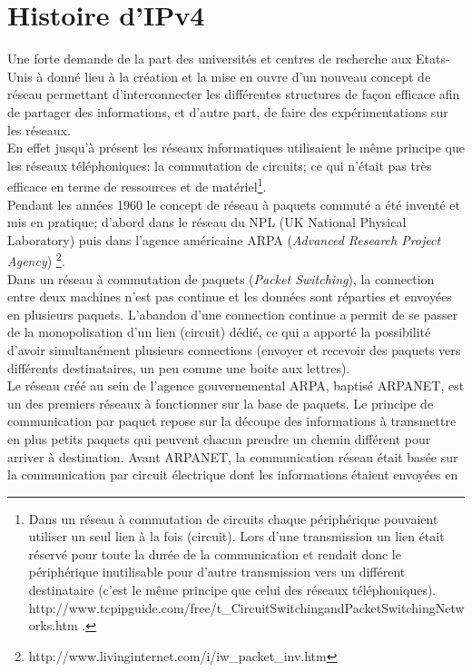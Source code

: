 \section{Histoire d'IPv4}
\label{sec:hist}

Une forte demande de la part des universités et centres de recherche aux
Etats-Unis à donné lieu à la création et la mise en ouvre d'un nouveau concept
de réseau permettant d'interconnecter les différentes structures de façon
efficace afin de partager des informations, et d'autre part, de faire des
expérimentations sur les réseaux.
\\
En effet jusqu'à présent les réseaux informatiques utilisaient le même principe que les
réseaux téléphoniques: la commutation de circuits; ce qui n'était pas très 
efficace en terme de ressources et de matériel\footnote {
Dans un réseau à commutation de circuits chaque périphérique pouvaient utiliser
un seul lien à la fois (circuit). Lors d'une transmission un lien était réservé
pour toute la durée de la communication et rendait donc le périphérique
inutilisable pour d'autre transmission vers un différent destinataire (c'est le même
principe que celui des réseaux téléphoniques).
http://www.tcpipguide.com/free/t\_CircuitSwitchingandPacketSwitchingNetworks.htm .}.
\\
Pendant les années 1960 le concept de réseau à paquets commuté a été inventé et mis en 
pratique; d'abord dans le réseau du NPL (UK National Physical Laboratory)
puis dans l'agence américaine ARPA ({\it Advanced Research Project Agency})
\footnote {http://www.livinginternet.com/i/iw\_packet\_inv.htm}.
\\
Dans un réseau à commutation de paquets ({\it Packet Switching}), la connection
entre deux machines n'est pas continue et les données sont réparties et
envoyées en plusieurs paquets.  L'abandon d'une connection continue a permit de
se passer de la monopolisation d'un lien (circuit) dédié, ce qui a apporté la
possibilité d'avoir simultanément plusieurs connections (envoyer et recevoir
des paquets vers différents destinataires, un peu comme une boite aux lettres). 
\\
Le réseau créé au sein de l'agence gouvernemental ARPA, baptisé ARPANET, est un
des premiers réseaux à fonctionner sur la base de paquets. Le principe de
communication par paquet repose sur la découpe des informations à transmettre en plus
petits paquets qui peuvent chacun prendre un chemin différent pour arriver à
destination.  Avant ARPANET, la communication réseau était basée sur la
communication par circuit électrique dont les informations étaient envoyées en
